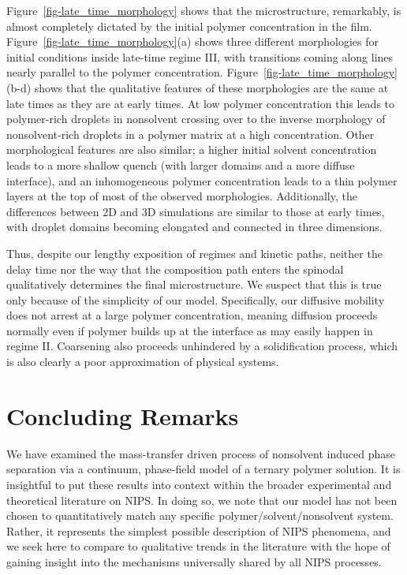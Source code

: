 \documentclass[journal=mamobx, layout=twocolumn]{achemso}
\begin{document}
Figure~\ref{fig-late_time_morphology} shows that the microstructure, remarkably, is almost completely dictated by the initial polymer concentration in the film.
Figure~\ref{fig-late_time_morphology}(a) shows three different morphologies for initial conditions inside late-time regime III, with transitions coming along lines nearly parallel to the polymer concentration.
Figure~\ref{fig-late_time_morphology}(b-d) shows that the qualitative features of these morphologies are the same at late times as they are at early times.
At low polymer concentration this leads to polymer-rich droplets in nonsolvent crossing over to the inverse morphology of nonsolvent-rich droplets in a polymer matrix at a high concentration.
Other morphological features are also similar; a higher initial solvent concentration leads to a more shallow quench (with larger domains and a more diffuse interface), and an inhomogeneous polymer concentration leads to a thin polymer layers at the top of most of the observed morphologies.
Additionally, the differences between 2D and 3D simulations are similar to those at early times, with droplet domains becoming elongated and connected in three dimensions.

Thus, despite our lengthy exposition of regimes and kinetic paths, neither the delay time nor the way that the composition path enters the spinodal qualitatively determines the final microstructure.
We suspect that this is true only because of the simplicity of our model.
Specifically, our diffusive mobility does not arrest at a large polymer concentration, meaning diffusion proceeds normally even if polymer builds up at the interface as may easily happen in regime II.
Coarsening also proceeds unhindered by a solidification process, which is also clearly a poor approximation of physical systems.

\section{Concluding Remarks}
We have examined the mass-transfer driven process of nonsolvent induced phase separation via a continuum, phase-field model of a ternary polymer solution.
It is insightful to put these results into context within the broader experimental and theoretical literature on NIPS.
In doing so, we note that our model has not been chosen to quantitatively match any specific polymer/solvent/nonsolvent system.
Rather, it represents the simplest possible description of NIPS phenomena, and we seek here to compare to qualitative trends in the literature with the hope of gaining insight into the mechanisms universally shared by all NIPS processes.
\end{document}
